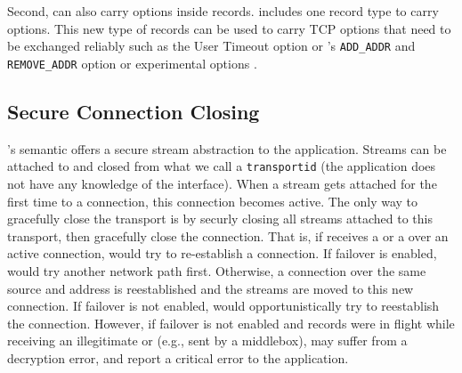 Second, \tcpls can also carry \tcp options inside \tls records. \tcpls includes
one record type to carry \tcp options. This new type of records can be used to carry TCP options that need to be exchanged reliably such as the \tcp User Timeout option \cite{rfc5482} or \mptcp's \texttt{ADD\_ADDR} and \texttt{REMOVE\_ADDR} option or experimental \tcp options \cite{rfc6994}.



\subsection{Secure Connection Closing}
\tcpls's semantic offers a secure stream abstraction to the application.
Streams can be attached to and closed from what we call a \texttt{transportid}
(the application does not have any knowledge of the \tcp interface). When a stream gets attached for the first time to a \tcp connection, this connection becomes active.  The only way to gracefully close the transport is by securly closing all
streams attached to this transport, then \tcpls gracefully close the \tcp
connection. That is, if \tcpls receives a \rst or a \fin over an active \tcp
connection, \tcpls would try to re-establish
a \tcp connection. If failover is enabled, \tcpls would try another
network path first. Otherwise, a connection over the same
 source and address is
reestablished and the streams are moved to this new \tcp
connection. If failover is not enabled, \tcpls would opportunistically try to
reestablish the connection. However, if failover is not enabled and
records were in flight while receiving an illegitimate \rst or \fin
(e.g., sent by a middlebox), \tcpls may suffer from a decryption error, and report a critical
error to the application.




